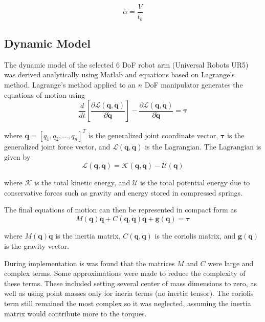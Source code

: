 \documentclass[conference]{IEEEtran}
\begin{document}
\begin{equation*}
  \alpha = \frac{V}{t_b}
\end{equation*}


\subsection{Dynamic Model}
The dynamic model of the selected 6 DoF robot arm (Universal Robots UR5) was
derived analytically using Matlab and equations based on Lagrange's
method. Lagrange's method applied to an $n$ DoF manipulator generates the
equations of motion using
\begin{equation*}
  \frac{d}{dt} \left[ \frac{\partial \mathcal{L}(\boldsymbol{q}, \dot{\boldsymbol{q}})}{\partial \dot{\boldsymbol{q}}} \right] - \frac{\partial \mathcal{L}(\boldsymbol{q}, \dot{\boldsymbol{q}})}{\partial \dot{\boldsymbol{q}}} = \boldsymbol{\tau}
\end{equation*}

where $\boldsymbol{q}=[q_1, q_2, ..., q_n]^T$ is the generalized joint
coordinate vector, $\boldsymbol{\tau}$ is the generalized joint force vector,
and $\mathcal{L}(\boldsymbol{q}, \dot{\boldsymbol{q}})$ is the Lagrangian. The
Lagrangian is given by
\begin{equation*}
  \mathcal{L}(\boldsymbol{q}, \dot{\boldsymbol{q}}) = \mathcal{K}(\boldsymbol{q}, \dot{\boldsymbol{q}}) - \mathcal{U}(\boldsymbol{q})
\end{equation*}

where $\mathcal{K}$ is the total kinetic energy, and $\mathcal{U}$ is the total
potential energy due to conservative forces such as gravity and energy stored in
compressed springs.

The final equations of motion can then be represented in compact form as
\begin{equation*}
  M(\boldsymbol{q})\ddot{\boldsymbol{q}} + C(\boldsymbol{q}, \dot{\boldsymbol{q}})\dot{\boldsymbol{q}} + \boldsymbol{g}(\boldsymbol{q}) = \boldsymbol{\tau}
\end{equation*}

where $M(\boldsymbol{q})\ddot{\boldsymbol{q}}$ is the inertia matrix,
$C(\boldsymbol{q}, \dot{\boldsymbol{q}})$ is the coriolis matrix, and
$\boldsymbol{g}(\boldsymbol{q})$ is the gravity vector.

During implementation is was found that the matrices $M$ and $C$ were large and
complex terms. Some approximations were made to reduce the complexity of these
terms. These included setting several center of mass dimensions to zero, as well
as using point masses only for ineria terms (no inertia tensor). The
coriolis term still remained the most complex so it was neglected, assuming the
inertia matrix would contribute more to the torques.
\end{document}
